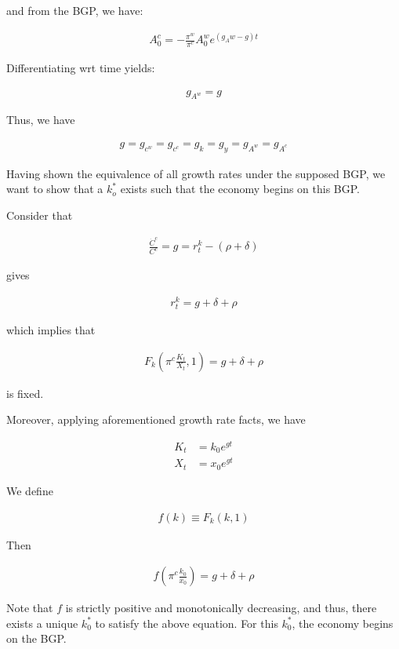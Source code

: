 and from the BGP, we have:

\begin{align}
    A_0^c=-\frac{\pi^w}{\pi^c} A_0^w e^{\left(g_A w-g\right) t}
\end{align}

Differentiating wrt time yields:

\begin{align}
    g_{A^w}=g
\end{align}

Thus, we have 

\begin{align}
    g=g_{c^w}=g_{c^c}=g_k=g_y=g_{A^w}= g_{A^c}
\end{align}

Having shown the equivalence of all growth rates under 
the supposed BGP, we want to show that a $k_o^*$ exists such that 
the economy begins on this BGP.

Consider that 

\begin{align}
    \frac{\dot{C}^c}{C^c}=g=r_t^k-(\rho+\delta)
\end{align}

gives 

\begin{align}
    r_t^k=g+\delta+\rho
\end{align}

which implies that 

\begin{align}
    F_k\left(\pi^c \frac{K_t}{X_t}, 1\right)=g+\delta+\rho
\end{align}

is fixed.

Moreover, applying aforementioned growth rate facts, we have 

\begin{align}
    K_t&=k_0 e^{g t}\\
    X_t&=x_0 e^{g t}
\end{align}


We define 

\begin{align}
    f(k) \equiv F_k(k, 1)
\end{align}

Then

\begin{align}
    f\left(\pi^c \frac{k_0}{x_0}\right)=g+\delta+\rho
\end{align}

Note that $f$ is strictly positive and monotonically decreasing,
and thus, there exists a unique $k_0^*$ to satisfy the above equation.
For this $k_0^*$, the economy begins on the BGP.


